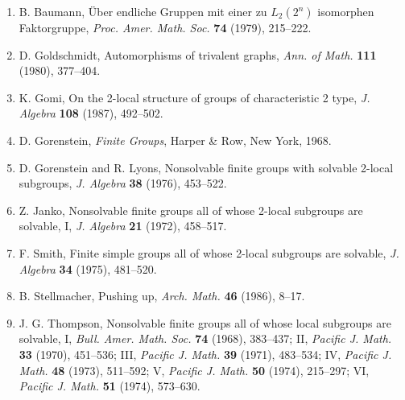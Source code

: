 \documentclass[11pt]{article}
\theoremstyle{plain}
\theoremstyle{stmplain}
\begin{document}
\begin{enumerate}
\item B. Baumann, \"Uber endliche Gruppen mit einer zu $L_2(2^n)$ isomorphen
  Faktorgruppe, \emph{Proc. Amer. Math. Soc.} \textbf{74} (1979), 215--222.
\item D. Goldschmidt, Automorphisms of trivalent graphs, \emph{Ann. of Math.}
  \textbf{111} (1980), 377--404.
\item K. Gomi, On the 2-local structure of groups of characteristic 2 type,
  \emph{J. Algebra} \textbf{108} (1987), 492--502.
\item D. Gorenstein, \emph{Finite Groups}, Harper \& Row, New York, 1968.
\item D. Gorenstein and R. Lyons, Nonsolvable finite groups with solvable
  2-local subgroups, \emph{J. Algebra} \textbf{38} (1976), 453--522.
\item Z. Janko, Nonsolvable finite groups all of whose 2-local subgroups are
  solvable, I, \emph{J. Algebra} \textbf{21} (1972), 458--517.
\item F. Smith, Finite simple groups all of whose 2-local subgroups are
  solvable, \emph{J. Algebra} \textbf{34} (1975), 481--520.
\item B. Stellmacher, Pushing up, \emph{Arch. Math.} \textbf{46} (1986), 8--17.
\item J. G. Thompson, Nonsolvable finite groups all of whose local subgroups
  are solvable, I, \emph{Bull. Amer. Math. Soc.} \textbf{74} (1968), 383--437;
  II, \emph{Pacific J. Math.} \textbf{33} (1970), 451--536; III, \emph{Pacific
  J. Math.} \textbf{39} (1971), 483--534; IV, \emph{Pacific J. Math.}
  \textbf{48} (1973), 511--592; V, \emph{Pacific J. Math.} \textbf{50}
  (1974), 215--297; VI, \emph{Pacific J. Math.} \textbf{51} (1974), 573--630.
\end{enumerate}
\end{document}

